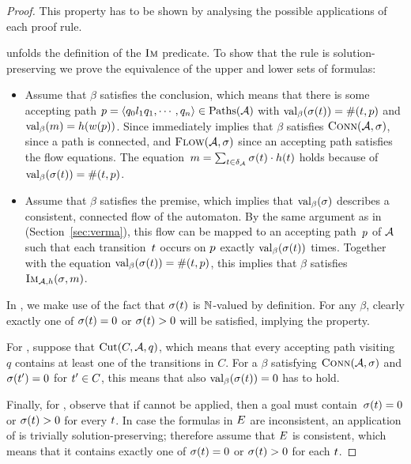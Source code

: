 \documentclass[acmsmall,review,anonymous,screen]{acmart}\settopmatter{printfolios=true,printccs=false,printacmref=true}
\theoremstyle{definition}
\begin{document}
\begin{proof}
  This property has to be shown by analysing the possible applications
  of each proof rule.

  \Expand{} unfolds the definition of the $\operatorname{\textsc{Im}}$ predicate. To show
  that the rule is solution-preserving we prove the equivalence of the
  upper and lower sets of formulas:
  \begin{itemize}
  \item Assume that $\beta$ satisfies the conclusion, which means that
    there is some accepting path
    $p = \left\langle q_0 l_1 q_1 , \cdots , q_n\right\rangle \in \operatorname{Paths}(\mathcal{A})$ with
    $\operatorname{val}_\beta(\operatorname{\sigma}(t)) = \operatorname{\#}(t,
    p)$ and $\operatorname{val}_\beta(m) =
    h(w(p))$. Since immediately implies that $\beta$
    satisfies $\operatorname{\textsc{Conn}}(\mathcal{A}, \operatorname{\sigma})$, since a path is
    connected, and $\textsc{Flow}(\mathcal{A}, \operatorname{\sigma})$ since an accepting
    path satisfies the flow equations. The
    equation~$m = \sum_{t \in
      \delta_{\mathcal{A}}}\operatorname{\sigma}(t) \cdot
    h(t)$ holds because of
    $\operatorname{val}_\beta(\operatorname{\sigma}(t)) = \operatorname{\#}(t,
    p)$.
  \item Assume that $\beta$ satisfies the premise, which implies that
    $\operatorname{val}_\beta(\operatorname{\sigma})$ describes a consistent, connected flow of
    the automaton. By the same argument as in
    \cite{generate-parikh-image} (Section~\ref{sec:verma}), this flow
    can be mapped to an accepting path~$p$ of $\mathcal{A}$ such
    that each transition~$t$ occurs on $p$ exactly
    $\operatorname{val}_\beta(\operatorname{\sigma}(t))$ times. Together with the equation
    $\operatorname{val}_\beta(\operatorname{\sigma}(t)) = \operatorname{\#}(t,
    p)$, this implies that $\beta$ satisfies $\operatorname{\textsc{Im}}_{\mathcal{A}, h}(\operatorname{\sigma}, m)$.
  \end{itemize}

  In \Split{}, we make use of the fact that $\operatorname{\sigma}(t)$ is
  $\mathbb{N}$-valued by definition. For any $\beta$, clearly exactly
  one of $\operatorname{\sigma}(t) = 0$ or $\operatorname{\sigma}(t) > 0$ will
  be satisfied, implying the property.

  For \Propagate{}, suppose that
  $\operatorname{Cut}(C, \mathcal{A}, q)$, which means that every
  accepting path visiting~$q$ contains at least one of the transitions
  in $C$. For a $\beta$ satisfying $\operatorname{\textsc{Conn}}(\mathcal{A}, \operatorname{\sigma})$
  and $\operatorname{\sigma}(t') = 0$ for $t' \in C$, this means
  that also $\operatorname{val}_\beta(\operatorname{\sigma}(t)) = 0$ has to hold.

  Finally, for \Subsume{}, observe that if \Split{} cannot be applied,
  then a goal must contain~$\operatorname{\sigma}(t) = 0$ or
  $\operatorname{\sigma}(t) > 0$ for every $t$. In case the
  formulas in $E$ are inconsistent, an application of
  \Subsume{} is trivially solution-preserving; therefore assume that
  $E$ is consistent, which means that it contains
  exactly one of $\operatorname{\sigma}(t) = 0$ or
  $\operatorname{\sigma}(t) > 0$ for each $t$.
\end{proof}
\end{document}
